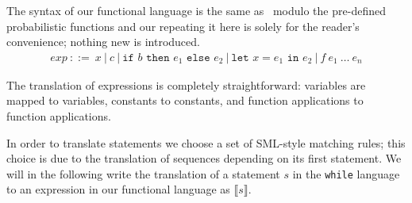 \documentclass[11pt, leqno, titlepage]{article}
\theoremstyle{definition}
\begin{document}
The syntax of our functional language is the same as \rml\ modulo the pre-defined
probabilistic functions and our repeating it here is solely for the reader's
convenience; nothing new is introduced. 
\begin{align*}
  exp~::= ~ x~\vert ~ c~\vert ~ \texttt{if }b\texttt{ then }e_1\texttt{ else } e_2~
  \vert ~ \texttt{let }x = e_1 \texttt{ in }e_2~\vert ~ f~e_1~\dots~e_n
\end{align*}


The translation of expressions is completely straightforward: variables are mapped to
variables, constants to constants, and function applications to function
applications.

In order to translate statements we choose a set of SML-style matching rules; this
choice is due to the translation of sequences depending on its first statement. We
will in the following write the translation of a statement $s$ in the \texttt{while}
language to an expression in our functional language as $\llbracket s \rrbracket$. 
\end{document}

